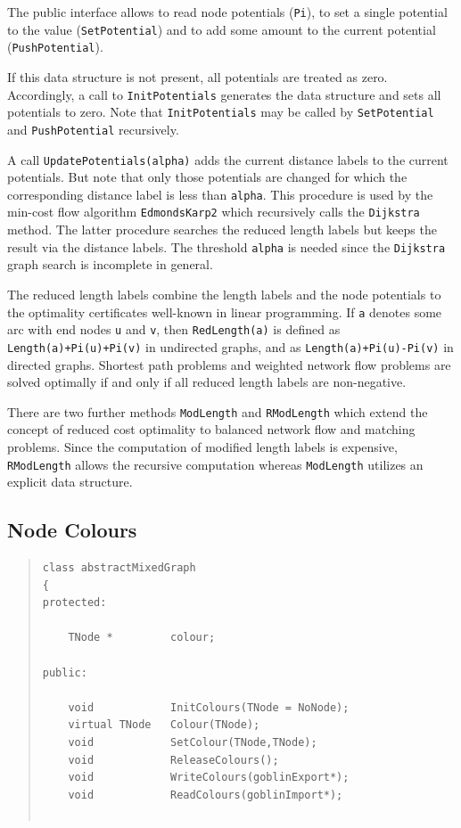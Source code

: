 \documentclass[a4paper,11pt,twoside]{book}
\begin{document}
\begin{multicols}{2}
The public interface allows to read node potentials (\verb/Pi/), to set
a single potential to the value (\verb/SetPotential/) and to add some amount
to the current potential (\verb/PushPotential/).

If this data structure is not present, all potentials are treated as zero.
Accordingly, a call to \verb/InitPotentials/ generates the data structure and
sets all potentials to zero. Note that \verb/InitPotentials/ may be called by
\verb/SetPotential/ and \verb/PushPotential/ recursively.

A call \verb/UpdatePotentials(alpha)/ adds the current distance labels to the
current potentials. But note that only those potentials are changed for which
the corresponding distance label is less than \verb/alpha/. This procedure is
used by the min-cost flow algorithm \verb/EdmondsKarp2/ which recursively calls
the \verb/Dijkstra/ method. The latter procedure searches the reduced length
labels but keeps the result via the distance labels. The threshold \verb/alpha/
is needed since the \verb/Dijkstra/ graph search is incomplete in general.

The reduced length labels combine the length labels and the node potentials
to the optimality certificates well-known in linear programming. If \verb/a/
denotes some arc with end nodes \verb/u/ and \verb/v/, then \verb/RedLength(a)/
is defined as \verb/Length(a)+Pi(u)+Pi(v)/ in undirected graphs, and as
\verb/Length(a)+Pi(u)-Pi(v)/ in directed graphs. Shortest path problems
and weighted network flow problems are solved optimally if and only if all
reduced length labels are non-negative.

There are two further methods \verb/ModLength/ and \verb/RModLength/ which
extend the concept of reduced cost optimality to balanced network flow and
matching problems. Since the computation of modified length labels is
expensive, \verb/RModLength/ allows the recursive computation whereas
\verb/ModLength/ utilizes an explicit data structure.


\subsection{Node Colours}
\label{slb_colour}
\methods
\begin{quote}
\begin{verbatim}
class abstractMixedGraph
{
protected:

    TNode *         colour;

public:

    void            InitColours(TNode = NoNode);
    virtual TNode   Colour(TNode);
    void            SetColour(TNode,TNode);
    void            ReleaseColours();
    void            WriteColours(goblinExport*);
    void            ReadColours(goblinImport*);


\end{verbatim}
\end{quote}
\end{multicols}
\end{document}
